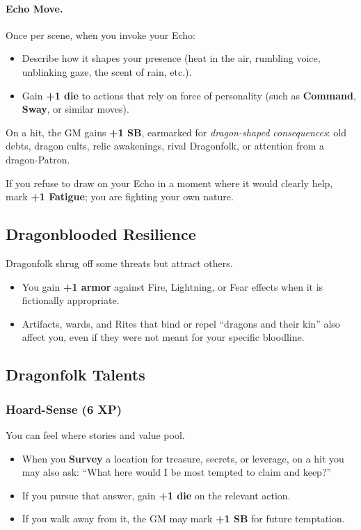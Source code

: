 \documentclass[11pt]{book}
\begin{document}
\paragraph{Echo Move.}
Once per scene, when you invoke your Echo:
\begin{itemize}
  \item Describe how it shapes your presence (heat in the air, rumbling voice, unblinking gaze, the scent of rain, etc.).
  \item Gain \textbf{+1 die} to actions that rely on force of personality (such as \textbf{Command}, \textbf{Sway}, or similar moves).
\end{itemize}

On a hit, the GM gains \textbf{+1 SB}, earmarked for \emph{dragon-shaped consequences}:
old debts, dragon cults, relic awakenings, rival Dragonfolk, or attention from a dragon-Patron.

If you refuse to draw on your Echo in a moment where it would clearly help, mark \textbf{+1 Fatigue}; you are fighting your own nature.

\subsection{Dragonblooded Resilience}
\label{subsec:dragon_resilience}

Dragonfolk shrug off some threats but attract others.

\begin{itemize}
  \item You gain \textbf{+1 armor} against Fire, Lightning, or Fear effects when it is fictionally appropriate.
  \item Artifacts, wards, and Rites that bind or repel ``dragons and their kin'' also affect you, even if they were not meant for your specific bloodline.
\end{itemize}

\subsection{Dragonfolk Talents}
\label{subsec:dragonfolk_talents}

\subsubsection{Hoard-Sense (6 XP)}
\label{talent:hoard_sense}

You can feel where stories and value pool.

\begin{itemize}
  \item When you \textbf{Survey} a location for treasure, secrets, or leverage, on a hit
        you may also ask: ``What here would I be most tempted to claim and keep?''
  \item If you pursue that answer, gain \textbf{+1 die} on the relevant action.
  \item If you walk away from it, the GM may mark \textbf{+1 SB} for future temptation.
\end{itemize}
\end{document}
